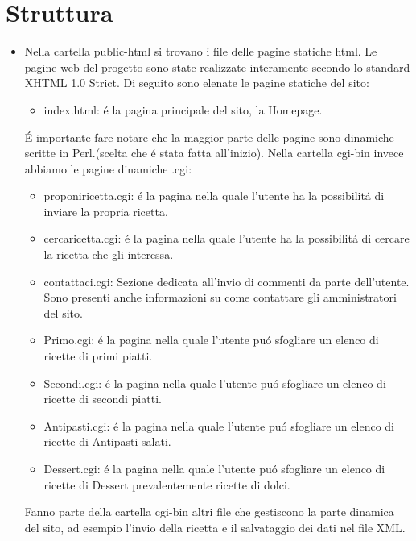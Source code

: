 \documentclass[12pt]{article}
\begin{document}
			\section{Struttura}
			\begin{itemize}
				\item Nella cartella public-html si trovano i file delle pagine statiche html.
				Le pagine web del progetto sono state realizzate interamente secondo lo standard XHTML 1.0 Strict. Di seguito sono elenate le pagine statiche del sito:
				\begin{itemize} \item index.html: \'e la pagina principale del sito, la Homepage.
					\end{itemize}
				
				\'E importante fare notare che la maggior parte delle pagine sono dinamiche scritte in Perl.(scelta che \'e stata fatta all'inizio).
				Nella cartella cgi-bin invece abbiamo le pagine dinamiche .cgi:
				\begin{itemize} \item proponiricetta.cgi: \'e la pagina nella quale l'utente ha la possibilit\'a di inviare la propria ricetta.
				\end{itemize}
				\begin{itemize} \item cercaricetta.cgi: \'e la pagina nella quale l'utente ha la possibilit\'a di cercare la ricetta che gli interessa.
				\end{itemize}
				\begin{itemize} \item contattaci.cgi: Sezione dedicata all'invio di commenti da parte dell'utente. Sono presenti anche informazioni su come contattare gli amministratori del sito.
				\end{itemize}
				\begin{itemize} \item Primo.cgi: \'e la pagina nella quale l'utente pu\'o sfogliare un elenco di ricette di primi piatti.
				\end{itemize}
				\begin{itemize} \item Secondi.cgi: \'e la pagina nella quale l'utente pu\'o sfogliare un elenco di ricette di secondi piatti.
				\end{itemize}
				\begin{itemize} \item Antipasti.cgi: \'e la pagina nella quale l'utente pu\'o sfogliare un elenco di ricette di Antipasti salati.
				\end{itemize}
				\begin{itemize} \item Dessert.cgi: \'e la pagina nella quale l'utente pu\'o sfogliare un elenco di ricette di Dessert prevalentemente ricette di dolci.
				\end{itemize}
				Fanno parte della cartella cgi-bin altri file che gestiscono la parte dinamica del sito, ad esempio l'invio della ricetta e il salvataggio dei dati nel file XML.
				
			\end{itemize}
			
\end{document}
